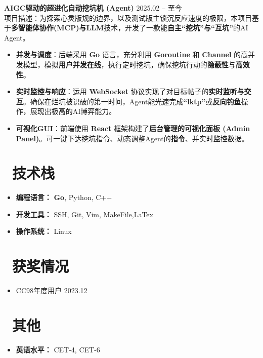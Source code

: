 \documentclass[11pt]{article}
\newlength{\interProjectSpacing}
\newcommand{\projectsep}{\vspace{\interProjectSpacing}}
\newlength{\intraProjectTitleSep}
\newcommand{\titlebreak}{\\[\intraProjectTitleSep]}
\newlength{\intraProjectListTopSep}
\begin{document}
\projectsep

\textbf{AIGC驱动的超进化自动挖坑机 (Agent)} \hfill 2025.02 -- 至今 \titlebreak
项目描述：为探索心灵版规的边界，以及测试版主锁沉反应速度的极限，本项目基于\textbf{多智能体协作(MCP)与LLM}技术，开发了一款能\textbf{自主“挖坑”与“互坑”}的AI Agent。
\begin{itemize}[nosep, topsep=\intraProjectListTopSep]
    \item \textbf{并发与调度}：后端采用 \textbf{Go} 语言，充分利用 \textbf{Goroutine} 和 \textbf{Channel} 的高并发模型，模拟\textbf{用户并发在线}，执行定时挖坑，确保挖坑行动的\textbf{隐蔽性}与\textbf{高效性}。
    \item \textbf{实时监控与响应}：运用 \textbf{WebSocket} 协议实现了对目标帖子的\textbf{实时监听与交互}。确保在烂坑被识破的第一时间，Agent能光速完成\textbf{“lktp”}或\textbf{反向钓鱼}操作，展现出极高的AI博弈能力。
    \item \textbf{可视化GUI}：前端使用 \textbf{React} 框架构建了\textbf{后台管理的可视化面板 (Admin Panel)}。可一键下达挖坑指令、动态调整Agent的\textbf{指令}、并实时监控数据。
\end{itemize}

\section{\makebox[\widthof{\faCogs}][c]{\color{CVBlue}\faCogs}\ 技术栈}
\begin{itemize}[nosep]
    \item \textbf{编程语言：} \textbf{Go}, Python, C++
    \item \textbf{开发工具：} SSH, Git, Vim, MakeFile,LaTex
    \item \textbf{操作系统：} Linux
\end{itemize}
\section{\makebox[\widthof{\faGraduationCap}][c]{\color{CVBlue}\faList}\ 获奖情况}
\begin{itemize}
    \item CC98年度用户 \hfill 2023.12
    
\end{itemize}
    
\section{\makebox[\widthof{\faInfo}][c]{\color{CVBlue}\faInfo}\ 其他}
\begin{itemize}[parsep=0.5ex]
    \item \textbf{英语水平：} CET-4, CET-6
\end{itemize}
\end{document}
